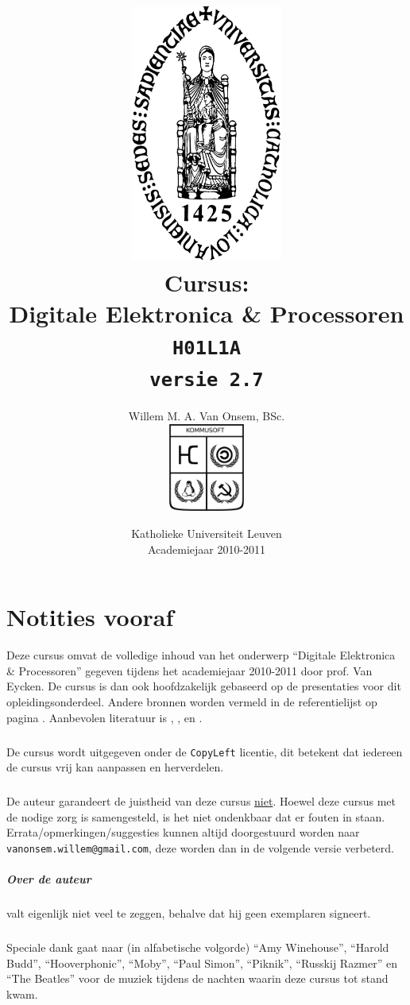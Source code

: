 \documentclass[a4paper,10pt,titlepage]{book}
\title{\includegraphics[width=5cm]{../SharedData/sedes.pdf}\\Cursus:\\Digitale Elektronica \& Processoren\\\texttt{H01L1A}\\\texttt{\small versie 2.7}}
\author{Willem M. A. Van Onsem, BSc.\\\includegraphics[width=2.5cm]{../SharedData/kommusoftEmblema.pdf}}
\date{Katholieke Universiteit Leuven\\Academiejaar 2010-2011}
\begin{document}
\frontmatter
\begin{titlepage}
\maketitle
\end{titlepage}
\tableofcontents
\chapter*{Notities vooraf}
\begin{it}
Deze cursus omvat de volledige inhoud van het onderwerp ``Digitale Elektronica \& Processoren'' gegeven tijdens het academiejaar 2010-2011 door prof. Van Eycken. De cursus is dan ook hoofdzakelijk gebaseerd op de presentaties voor dit opleidingsonderdeel. Andere bronnen worden vermeld in de referentielijst op pagina \pageref{biblio}. Aanbevolen literatuur is \cite{brown2004fundamentals}, \cite{gajski1997principles}, \cite{wakerly2000digital} en \cite{ashenden2008designer}.
\paragraph{}
De cursus wordt uitgegeven onder de \texttt{CopyLeft} licentie, dit betekent dat iedereen de cursus vrij kan aanpassen en herverdelen.
\paragraph{}
De auteur garandeert de juistheid van deze cursus \underline{niet}. Hoewel deze cursus met de nodige zorg is samengesteld, is het niet ondenkbaar dat er fouten in staan. Errata/opmerkingen/suggesties kunnen altijd doorgestuurd worden naar \verb+vanonsem.willem@gmail.com+, deze worden dan in de volgende versie verbeterd.
\paragraph{Over de auteur}
valt eigenlijk niet veel te zeggen, behalve dat hij geen exemplaren signeert.
\paragraph{}
Speciale dank gaat naar (in alfabetische volgorde) ``Amy Winehouse'', ``Harold Budd'', ``Hooverphonic'', ``Moby'', ``Paul Simon'', ``Piknik'', ``Russkij Razmer'' en ``The Beatles'' voor de muziek tijdens de nachten waarin deze cursus tot stand kwam.

\end{it}
\end{document}
